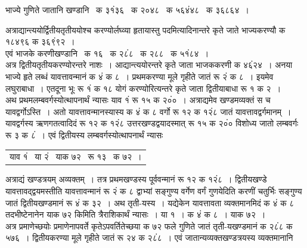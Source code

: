 \documentclass[11pt, openany]{book}
\begin{document}
\noindent भाज्ये गुणिते जातानि खण्डानि ~क ३१ं३६ ~क २०४८ ~क ५६४ं४८ ~क ३६८६४~। \\
\vspace{-4mm}

\noindent अत्राद्यान्त्ययोर्द्वितीयतृतीययोश्च करण्योर्लघ्व्या हृतायास्तु
पदमित्यादिनान्तरे कृते जाते 
भाज्यकरण्यौ क १८४९६ क ३६९ं९२~।\\

\vspace{-4mm}
 एवं भाजके करणीखण्डानि ~क १६ ~क २८ं८ ~क २८८ ~क ५१ं८४~। \\

\vspace{-4mm}
 अत्र द्वितीयतृतीयकरण्योरन्तरे नाशः~। आद्यान्त्ययोरन्तरे कृते जाता
भाजककरणी 
क ४६ं२४~। अनया भाज्ये हृते लब्धं यावत्तावन्मानं क ४ं क ८~। प्रथमकरण्या मूले गृहीते जातं रू २ं क ८~। इयमेव लघुराबाधा~। एतदूना भूः 
रू १ं क १८ योगं करण्योरित्यन्तरे कृते जाता द्वितीयाबाधा रू १ क २~।\\

\vspace{-4mm}
 अथ प्रथमलम्बवर्गस्योत्थापनार्थं न्यासः याव १ं रू १५ क २०ं०~। 
अत्राद्यमेव खण्डमव्यक्तं स च यावद्वर्गोऽस्ति~। अतो
यावत्तावन्मानस्यास्य क ४ं 
क ८ वर्गो रू १२ क १२ं८ जातं यावत्तावद्वर्गमानम्~। यावद्वर्गस्य
ऋणगतत्वादिदं 
रू १२ क १२ं८ उत्तरखण्डद्वयादस्मात् रू १५ क २०ं० विशोध्य जातो 
लम्बवर्गः रू ३ क ८ं~। एवं द्वितीयस्य लम्बवर्गस्योत्थापनार्थं न्यासः
\begin{table}[h!]
    \centering\s
    \begin{tabular}{l}
      याव १ं ~या २ं ~याक ७२ ~रू १३ ~क ७२~। 
    \end{tabular}
\end{table}
\vspace{-2mm}

 अत्राद्यं खण्डत्रयम् अव्यक्तम्~। तत्र प्रथमखण्डस्य पूर्ववन्मानं रू १२ क
१२ं८~। द्वितीयखण्डे यावत्तावद्द्वयमस्तीति यावत्तावन्मानं रू २ं  क ८
द्वाभ्यां सङ्गुण्य वर्गेण वर्गं गुणयेदिति करणीं चतुर्भिः सङ्गुण्य जातं द्वितीयखण्डमानं रू ४ं क ३२~। अथ तृती-यस्य~। यद्येकेन यावत्तावता व्यक्तमानमिदं क ४ं क ८
तदभीष्टेनानेन याक ७२ किमिति त्रैराशिकार्थं न्यासः~। या १~। क ४ं क ८~। याक ७२~। \\

\vspace{-4mm}
 अत्र प्रमाणेच्छयोः प्रमाणेनापवर्ते कृतेऽपवर्तितेच्छया क ७२ फले गुणिते जातं 
तृती-यखण्डमानं क २८ं८ क ५७६~। द्वितीयकरण्या मूले गृहीते जातं रू २४ क
\newpage
\noindent २८ं८~। एवं जातान्यव्यक्तखण्डत्रयस्य व्यक्तमानानि \\
\end{document}
